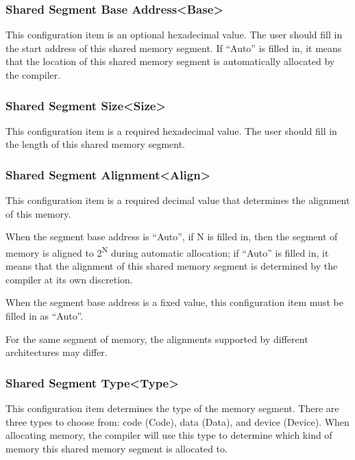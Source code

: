\subsubsection{Shared Segment Base Address<Base>{}}\label{subsubsec:5-3-11-2}

This configuration item is an optional hexadecimal value. The user should fill in the start address of this shared memory segment. If ``Auto'' is filled in, it means that the location of this shared memory segment is automatically allocated by the compiler.

\subsubsection{Shared Segment Size<Size>{}}\label{subsubsec:5-3-11-3}

This configuration item is a required hexadecimal value. The user should fill in the length of this shared memory segment.

\subsubsection{Shared Segment Alignment<Align>{}}\label{subsubsec:5-3-11-4}

This configuration item is a required decimal value that determines the alignment of this memory.

When the segment base address is ``Auto'', if N is filled in, then the segment of memory is aligned to 2\textsuperscript{N} during automatic allocation; if ``Auto'' is filled in, it means that the alignment of this shared memory segment is determined by the compiler at its own discretion.

When the segment base address is a fixed value, this configuration item must be filled in as ``Auto''.

For the same segment of memory, the alignments supported by different architectures may differ.

\subsubsection{Shared Segment Type<Type>{}}\label{subsubsec:5-3-11-5}

This configuration item determines the type of the memory segment. There are three types to choose from: code (Code), data (Data), and device (Device). When allocating memory, the compiler will use this type to determine which kind of memory this shared memory segment is allocated to.

